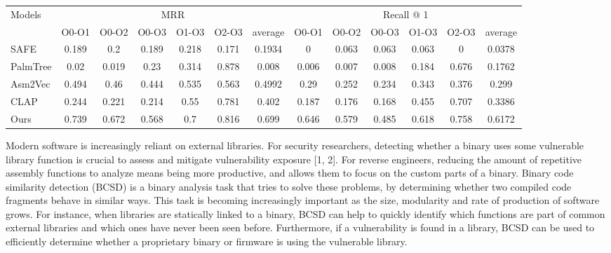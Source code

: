 \documentclass[conference,compsoc]{IEEEtran}
\begin{document}
\begin{table}[!t]
\begin{tabular}{lllcccccccccccc}
\multicolumn{3}{l}{\multirow{2}{*}{Models}} & \multicolumn{6}{c}{MRR}                         & \multicolumn{6}{c}{Recall @ 1}                  \\
\multicolumn{3}{l}{}                        & O0-O1 & O0-O2 & O0-O3 & O1-O3 & O2-O3 & average & O0-O1 & O0-O2 & O0-O3 & O1-O3 & O2-O3 & average \\
\multicolumn{3}{l}{SAFE}                    & 0.189 & 0.2   & 0.189 & 0.218 & 0.171 & 0.1934  & 0     & 0.063 & 0.063 & 0.063 & 0     & 0.0378  \\
\multicolumn{3}{l}{PalmTree}                & 0.02  & 0.019 & 0.23  & 0.314 & 0.878 & 0.008   & 0.006 & 0.007 & 0.008 & 0.184 & 0.676 & 0.1762  \\
\multicolumn{3}{l}{Asm2Vec}                 & 0.494 & 0.46  & 0.444 & 0.535 & 0.563 & 0.4992  & 0.29  & 0.252 & 0.234 & 0.343 & 0.376 & 0.299   \\
\multicolumn{3}{l}{CLAP}                    & 0.244 & 0.221 & 0.214 & 0.55  & 0.781 & 0.402   & 0.187 & 0.176 & 0.168 & 0.455 & 0.707 & 0.3386  \\
\multicolumn{3}{l}{Ours}                    & 0.739 & 0.672 & 0.568 & 0.7   & 0.816 & 0.699   & 0.646 & 0.579 & 0.485 & 0.618 & 0.758 & 0.6172 
\end{tabular}
\end{table}

Modern software is increasingly reliant on external libraries.
For security researchers, detecting whether a binary uses some vulnerable library function is crucial to assess
and mitigate vulnerability exposure [1, 2]. For reverse engineers, reducing the amount of repetitive assembly functions
to analyze means being more productive, and allows them to focus on the custom parts of a binary.  Binary code similarity
detection (BCSD) is a binary analysis task that tries to solve these problems, by determining whether two compiled
code fragments behave in similar ways. This task is becoming increasingly important as the size, modularity and rate of
production of software grows.  For instance, when libraries are statically linked to a binary, BCSD can help to
quickly identify which functions are part of common external libraries and which ones have never been seen before.
Furthermore, if a vulnerability is found in a library, BCSD can be used to efficiently determine whether a proprietary
binary or firmware is using the vulnerable library.
\end{document}
